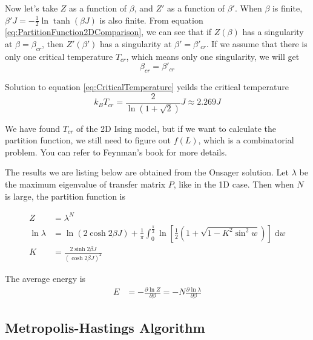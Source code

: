 \documentclass[11pt]{article}
\newcommand{\vd}{\mathrm{d}} %
\begin{document}
	Now let's take $Z$ as a function of $\beta$, and $Z'$ as a function of $\beta'$. When $\beta$ is finite, $\beta' J = -\frac12 \ln{\tanh(\beta J)}$ is also finite. From equation \eqref{eq:PartitionFunction2DComparison}, we can see that if $Z(\beta)$ has a singularity at $\beta = \beta_{cr}$, then $Z'(\beta')$ has a singularity at $\beta' = \beta'_{cr}$.
	If we assume that there is only one critical temperature $T_{cr}$, which means only one singularity, we will get
	\begin{equation} \label{eq:Singularity}
		\beta_{cr} = \beta'_{cr}
	\end{equation}

	Solution to equation \eqref{eq:CriticalTemperature} yeilds the critical temperature
	\begin{equation} \label{eq:CriticalTemperature}
		k_B T_{cr} = \frac{2}{\ln(1+\sqrt{2})}J \approx 2.269J
	\end{equation}

	We have found $T_{cr}$ of the 2D Ising model, but if we want to calculate the partition function, we still need to figure out $f(L)$, which is a combinatorial problem. You can refer to Feynman's book\cite{feynman1972statistical} for more details.

	The results we are listing below are obtained from the Onsager solution\cite{onsager_solution}. Let $\lambda$ be the maximum eigenvalue of transfer matrix $P$, like in the 1D case. Then when $N$ is large, the partition function is

	\begin{equation}
		\begin{split}
			Z &= \lambda^N \\
			\ln{\lambda} &= \ln{\left(2 \cosh{2\beta J}\right)} + \frac{1}{\pi}\int_0^{\frac{\pi}{2}} \ln{\left[\frac{1}{2}\left(1 + \sqrt{1 - K^2\sin^2{w}}\right)\right]\;\vd w} \\
			K &= \frac{2\sinh{2\beta J}}{\left(\cosh{2\beta J}\right)^2}
		\end{split}
	\end{equation}
	
	The average energy is
	\begin{equation}
		\begin{split}
			E &= - \frac{\partial \ln{Z}}{\partial \beta} = -N\frac{\partial \ln{\lambda}}{\partial \beta}
		\end{split}
	\end{equation}

	\subsection{Metropolis-Hastings Algorithm}
	\label{metropolis_algorithm}
	
\end{document}
